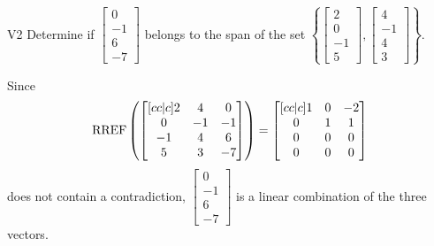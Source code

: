 \documentclass{sbgLAexam}
\begin{document}
\begin{problem}{V2}
  Determine if
  \(\begin{bmatrix} 0 \\ -1 \\ 6 \\ -7 \end{bmatrix}\)
  belongs to the span of the set
  \(\left\{
    \begin{bmatrix} 2 \\ 0 \\ -1 \\ 5 \end{bmatrix},
    \begin{bmatrix} 4 \\ -1 \\ 4 \\ 3 \end{bmatrix}
    \right\}
  \).
\end{problem}
\begin{solution}
  Since
  \[
    \operatorname{RREF}\left(
      \begin{bmatrix}[cc|c]
        2 & 4 & 0 \\
        0 & -1 & -1 \\
        -1 & 4 & 6 \\
        5 & 3 & -7
      \end{bmatrix}
    \right) =
    \begin{bmatrix}[cc|c]
      1 & 0 & -2 \\
      0 & 1 & 1 \\
      0 & 0 & 0 \\
      0 & 0 & 0
    \end{bmatrix}
  \]
  does not contain a contradiction,
  \(\begin{bmatrix} 0 \\ -1 \\ 6 \\ -7 \end{bmatrix}\) is
  a linear combination of the three vectors.
\end{solution}
\end{document}
